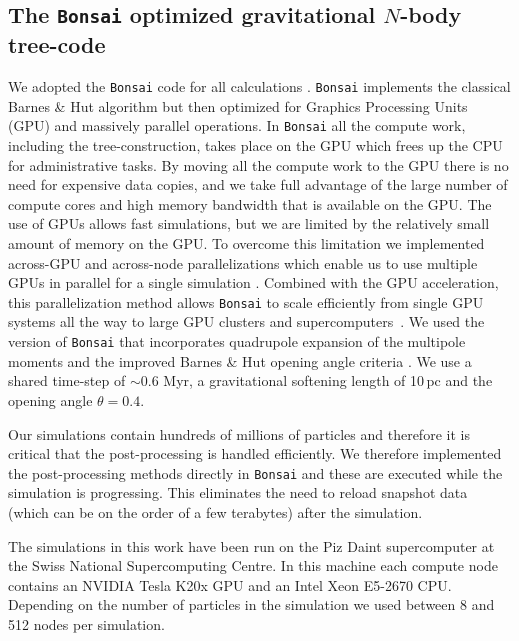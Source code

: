 \subsection{The {\tt Bonsai} optimized gravitational $N$-body tree-code}

We adopted the {\tt Bonsai} code for all calculations
\citep{2012JCoPh.231.2825B, 2014hpcn.conf...54B}.  {\tt Bonsai}
implements the classical Barnes \& Hut algorithm
\citep{1986Natur.324..446B} but then optimized for Graphics
Processing Units (GPU) and massively parallel operations. In {\tt Bonsai}
all the compute work, including the tree-construction, takes place on
the GPU which frees up the CPU for administrative tasks. By moving all
the compute work to the GPU there is no need for expensive data copies,
and we take full advantage of the large number of compute cores and
high memory bandwidth that is available on the GPU.  The use of GPUs
allows fast simulations, but we are limited by the relatively small
amount of memory on the GPU. To overcome this limitation we
implemented across-GPU and across-node parallelizations which enable
us to use multiple GPUs in parallel for a single simulation
\citep{2014hpcn.conf...54B}.  Combined with the GPU acceleration, this
parallelization method allows {\tt Bonsai} to scale efficiently from
single GPU systems all the way to large GPU clusters and
supercomputers~\citep{2014hpcn.conf...54B}.  We used the version of
{\tt Bonsai} that incorporates quadrupole expansion of the multipole
moments and the improved Barnes \& Hut opening angle criteria
\citep{2013MNRAS.436.1161I}.  We use a shared time-step of $\sim 0.6$
Myr, a gravitational softening length of 10\,pc and the opening angle
$\theta=0.4$.

Our simulations contain hundreds of millions of particles and
therefore it is critical that the post-processing is handled
efficiently.  We therefore implemented the post-processing methods directly in
{\tt Bonsai} and these are executed while the simulation is progressing. 
This eliminates the
need to reload snapshot data (which can be on the order of a few
terabytes) after the simulation.

The simulations in this work have been run on the Piz Daint supercomputer at
the Swiss National Supercomputing Centre. In this machine each compute node
contains an NVIDIA Tesla K20x GPU and an Intel Xeon E5-2670 CPU. Depending on the number
of particles in the simulation we used between 8 and 512 nodes per simulation.
